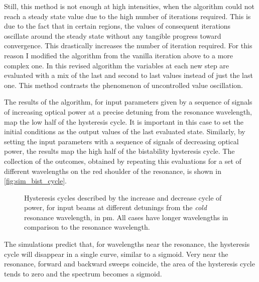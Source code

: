 Still, this method is not enough at high intensities, when the algorithm could not reach a steady state value due to the high number of iterations required.
This is due to the fact that in certain regions, the values of consequent iterations oscillate around the steady state without any tangible progress toward convergence.
This drastically increases the number of iteration required.
For this reason I modified the algorithm from the vanilla iteration above to a more complex one.
In this revised algorithm the variables at each new step are evaluated with a mix of the last and second to last values instead of just the last one.
This method contrasts the phenomenon of uncontrolled value oscillation.

The results of the algorithm, for input parameters given by a sequence of signals of increasing optical power at a precise detuning from the resonance wavelength, map the low half of the hysteresis cycle.
It is important in this case to set the initial conditions as the output values of the last evaluated state.
Similarly, by setting the input parameters with a sequence of signals of decreasing optical power, the results map the high half of the bistability hysteresis cycle.
The collection of the outcomes, obtained by repeating this evaluations for a set of different wavelengths on the red shoulder of the resonance, is shown in \autoref{fig:sim_bist_cycle}.

\begin{figure}[ht]
	\centering
%	
%	
	
	\caption{
		Hysteresis cycles described by the increase and decrease cycle of power, for input beams at different detunings from the \textit{cold} resonance wavelength, in \si{\pm}.
		All cases have longer wavelengths in comparison to the resonance wavelength.
	}
	\label{fig:sim_bist_cycle}
\end{figure}

The simulations predict that, for wavelengths near the resonance, the hysteresis cycle will disappear in a single curve, similar to a sigmoid.
Very near the resonance, forward and backward sweeps coincide, the area of the hysteresis cycle tends to zero and the spectrum becomes a sigmoid.

